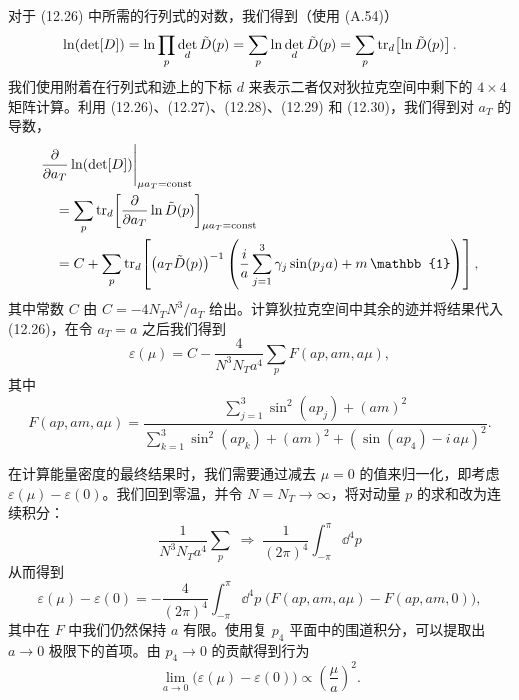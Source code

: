 对于 (12.26) 中所需的行列式的对数，我们得到（使用 (A.54)）
\begin{equation}
  \ln(\det[D]) = \ln\prod_p \det_d\tilde{D}(p)
    = \sum_p \ln\det_d\tilde{D}(p)
    = \sum_p \operatorname{tr}_d\!\left[\ln\tilde{D}(p)\right].
\end{equation}
我们使用附着在行列式和迹上的下标 $d$ 来表示二者仅对狄拉克空间中剩下的 $4\times 4$ 矩阵计算。利用 (12.26)、(12.27)、(12.28)、(12.29) 和 (12.30)，我们得到对 $a_T$ 的导数，
\begin{equation}
\begin{split}
  &\frac{\partial}{\partial a_T}\ln(\det[D])\Bigg|_{\mu a_T=\mathrm{const}}\\
  &\quad= \sum_p \tr_d\!\left[
    \frac{\partial}{\partial a_T}\ln\tilde{D}(p)
  \right]_{\mu a_T=\mathrm{const}} \\
  &\quad= C + \sum_p \tr_d\!\left[
    \left(a_T\tilde{D}(p)\right)^{-1}\left(
      \frac{i}{a}\sum_{j=1}^3\gamma_j\sin(p_j a) + m\,\mathbb{1}
    \right)
  \right],
\end{split}
\end{equation}
其中常数 $C$ 由 $C = -4N_T N^3/a_T$ 给出。计算狄拉克空间中其余的迹并将结果代入 (12.26)，在令 $a_T = a$ 之后我们得到
\begin{equation}
  \varepsilon(\mu) = C - \frac{4}{N^3 N_T a^4}\sum_p F(ap, am, a\mu),
\end{equation}
其中
\begin{equation}
  F(ap, am, a\mu)
  = \frac{\sum_{j=1}^3\sin^2(a p_j) + (am)^2}
         {\sum_{k=1}^3\sin^2(a p_k) + (am)^2
          + \left(\sin(a p_4) - i\,a\mu\right)^2}.
\end{equation}

在计算能量密度的最终结果时，我们需要通过减去 $\mu = 0$ 的值来归一化，即考虑 $\varepsilon(\mu) - \varepsilon(0)$。我们回到零温，并令 $N = N_T \to \infty$，将对动量 $p$ 的求和改为连续积分：
\begin{equation}
  \frac{1}{N^3 N_T a^4}\sum_p
  \;\Rightarrow\;
  \frac{1}{(2\pi)^4}\int_{-\pi}^{\pi}\dd^4 p
\end{equation}
从而得到
\begin{equation}
  \varepsilon(\mu) - \varepsilon(0) = -\frac{4}{(2\pi)^4}\int_{-\pi}^{\pi}
    \dd^4 p\;\big(F(ap,am,a\mu) - F(ap,am,0)\big),
\end{equation}
其中在 $F$ 中我们仍然保持 $a$ 有限。使用复 $p_4$ 平面中的围道积分，可以提取出 $a\to 0$ 极限下的首项。由 $p_4 \to 0$ 的贡献得到行为
\begin{equation}
  \lim_{a\to 0}\big(\varepsilon(\mu) - \varepsilon(0)\big) \propto
    \left(\frac{\mu}{a}\right)^2 .
\end{equation}

